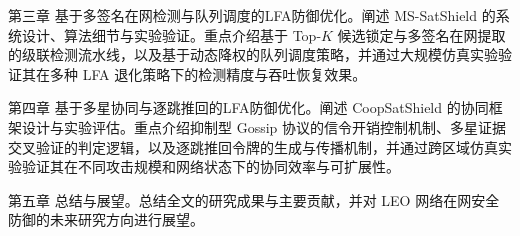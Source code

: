 第三章 基于多签名在网检测与队列调度的LFA防御优化。阐述 MS-SatShield 的系统设计、算法细节与实验验证。重点介绍基于 Top-$K$ 候选锁定与多签名在网提取的级联检测流水线，以及基于动态降权的队列调度策略，并通过大规模仿真实验验证其在多种 LFA 退化策略下的检测精度与吞吐恢复效果。

第四章 基于多星协同与逐跳推回的LFA防御优化。阐述 CoopSatShield 的协同框架设计与实验评估。重点介绍抑制型 Gossip 协议的信令开销控制机制、多星证据交叉验证的判定逻辑，以及逐跳推回令牌的生成与传播机制，并通过跨区域仿真实验验证其在不同攻击规模和网络状态下的协同效率与可扩展性。

第五章 总结与展望。总结全文的研究成果与主要贡献，并对 LEO 网络在网安全防御的未来研究方向进行展望。

